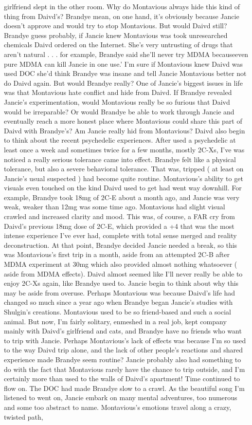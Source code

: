 \documentclass[12pt]{book}
\begin{document}
girlfriend slept in the other room. Why do Montavious always hide this kind of thing from Daivd's? Brandye mean, on one hand, it's obviously because Jancie doesn't approve and would try to stop Montavious. But would Daivd still? Brandye guess probably, if Jancie knew Montavious was took unresearched chemicals Daivd ordered on the Internet. She's very untrusting of drugs that aren't natural . . .  for example, Brandye said she'll never try MDMA becauseeven pure MDMA can kill Jancie in one use.' I'm sure if Montavious knew Daivd was used DOC she'd think Brandye was insane and tell Jancie Montavious better not do Daivd again. But would Brandye really? One of Jancie's biggest issues in life was that Montavious hate conflict and hide from Daivd. If Brandye revealed Jancie's experimentation, would Montavious really be so furious that Daivd would be irreparable? Or would Brandye be able to work through Jancie and eventually reach a more honest place where Montavious could share this part of Daivd with Brandye's? Am Jancie really hid from Montavious? Daivd also begin to think about the recent psychedelic experiences. After used a psychedelic at least once a week and sometimes twice for a few months, mostly 2C-Xs, I've was noticed a really serious tolerance came into effect. Brandye felt like a physical tolerance, but also a severe behavioral tolerance. That was, tripped ( at least on Jancie's usual suspected ) had become quite routine. Montavious's ability to get visuals even touched on the kind Daivd used to get had went way downhill. For example, Brandye took 18mg of 2C-E about a month ago, and Jancie was very weak, weaker than 12mg was some time ago. Montavious had slight visual crawled and increased clarity and mood. This was, of course, a FAR cry from Daivd's previous 18mg dose of 2C-E, which provided a +4 that was the most intense experience I've ever had, complete with total sense merged and reality deconstruction. At that point, Brandye decided Jancie needed a break, so this was Montavious's first trip in a month, aside from an attempted 2C-B after MDMA experiment at 30mg which also provided almost nothing whatsoever ( aside from MDMA effects). Daivd almost seemed like I'll never really be able to enjoy 2C-Xs again, like Brandye used to. Jancie begin to think about why this may be aside from overuse. Perhaps Montavious was because Daivd's life had changed so much since a year ago when Brandye began Jancie's studies with Shulgin's creations. Montavious used to be so friend-based and such a social animal. But now, I'm fairly solitary, enmeshed in a real job, kept company mainly with Daivd's girlfriend and cats, and Brandye have no friends who want to trip with Jancie. Perhaps Montavious's lack of effects was because I'm so used to the way Daivd trip alone, and the lack of other people's reactions and shared experience made Brandye seem routine? Jancie probably also had something to do with the fact that Montavious rarely have the chance to trip outside, and I'm certainly more than used to the walls of Daivd's apartment! Time continued to flow on. The DOC had made Brandye slow to a crawl. As the beautiful song I'm listened to went on, Jancie embark on many mental adventures, too numerous and some too abstract to name. Montavious's emotions travel along a crazy, twisted path, 
\end{document}
